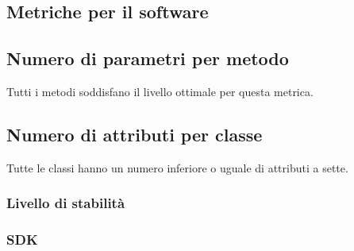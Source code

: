 \subsection{Metriche per il software}

\subsection{Numero di parametri per metodo}

Tutti i metodi soddisfano il livello ottimale per questa metrica.

\subsection{Numero di attributi per classe}

Tutte le classi hanno un numero inferiore o uguale di attributi a sette.

\subsubsection{Livello di stabilità}

\subsubsection{SDK}

